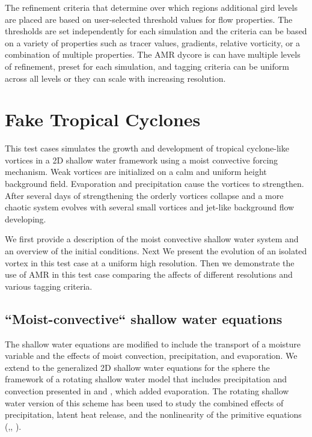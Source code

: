   The refinement criteria that determine over which regions additional gird levels are placed are based on user-selected threshold values for flow properties.  The thresholds are set independently for each simulation and the criteria can be based on a variety of properties such as tracer values, gradients, relative vorticity, or a combination of multiple properties.  The AMR dycore is can have multiple levels of refinement, preset for each simulation, and tagging criteria can be uniform across all levels or they can scale with increasing resolution.
 
\section{Fake Tropical Cyclones} 
  This test cases simulates the growth and development of tropical cyclone-like 
  vortices in a 2D shallow water framework using a moist convective forcing 
  mechanism. Weak vortices are initialized on a calm and uniform height 
  background field. Evaporation and precipitation cause the vortices to strengthen. 
  After several days of strengthening the orderly vortices collapse and a more chaotic 
  system evolves with several small vortices and jet-like background flow developing. 

  We first provide a description of the moist convective shallow water system 
  and an overview of the initial conditions. Next We present the evolution of an 
  isolated vortex in this test case at a uniform high resolution. Then we demonstrate
  the use of AMR in this test case comparing the affects of different resolutions and
  various tagging criteria.

  \subsection{``Moist-convective`` shallow water equations }
     The shallow water equations are modified to include the transport of a 
     moisture variable and the effects of moist convection, precipitation, and evaporation. 
     We extend to the generalized 2D shallow water equations for the sphere the framework
     of a rotating shallow water model that includes precipitation and convection 
     presented in \cite{bouchut2009fronts} and \cite{lahaye2016understanding}, 
     which added evaporation. The rotating shallow water version of this scheme 
     has been used to study the combined effects of precipitation, latent heat release, 
     and the nonlinearity of the primitive equations 
     (\cite{bouchut2009fronts},\cite{lambaerts2011moist}, \cite{lahaye2016understanding}).
     
